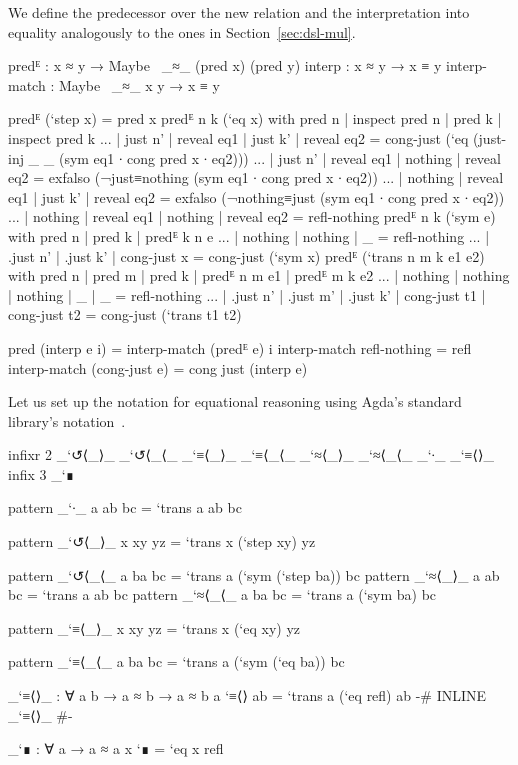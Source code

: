 We define the predecessor over the new  relation and the
interpretation into equality analogously to the ones in
Section~\ref{sec:dsl-mul}.
\begin{code}
predᴱ : x ≈ y → Maybe~ _≈_ (pred x) (pred y)
interp : x ≈ y → x ≡ y
interp-match : Maybe~ _≈_ x y → x ≡ y
\end{code}
\begin{code}[hide]
predᴱ (`step x) = pred x
predᴱ {n} {k} (`eq x) with pred n | inspect pred n | pred k | inspect pred k
... | just n' | reveal eq1 | just k' | reveal eq2 = cong-just (`eq (just-inj _ _ (sym eq1 ∙ cong pred x ∙ eq2)))
... | just n' | reveal eq1 | nothing | reveal eq2 = exfalso (¬just≡nothing (sym eq1 ∙ cong pred x ∙ eq2))
... | nothing | reveal eq1 | just k' | reveal eq2 = exfalso (¬nothing≡just (sym eq1 ∙ cong pred x ∙ eq2))
... | nothing | reveal eq1 | nothing | reveal eq2 = refl-nothing
predᴱ {n} {k} (`sym e) with pred n | pred k | predᴱ {k} {n} e
... | nothing  | nothing  | _ = refl-nothing
... | .just n' | .just k' | cong-just x = cong-just (`sym x)
predᴱ (`trans {n} {m} {k} e1 e2) with pred n | pred m | pred k | predᴱ {n} {m} e1 | predᴱ {m} {k} e2
... | nothing  | nothing  | nothing  | _  | _  = refl-nothing
... | .just n' | .just m' | .just k' | cong-just t1 | cong-just t2 = cong-just (`trans t1 t2)
\end{code}
\begin{code}[hide]
pred (interp e i) = interp-match (predᴱ e) i
interp-match refl-nothing = refl
interp-match (cong-just e) = cong just (interp e)
\end{code}

Let us set up the notation for equational reasoning using Agda's standard
library's notation~\cite{agda-stdlib}.
\begin{AgdaSuppressSpace}
\begin{code}[hide]
infixr 2 _`↺⟨_⟩_ _`↺⟨_⟨_ _`≡⟨_⟩_ _`≡⟨_⟨_ _`≈⟨_⟩_ _`≈⟨_⟨_ _`∙_ _`≡⟨⟩_
infix  3 _`∎

pattern _`∙_  {a} ab bc = `trans {a} ab bc
\end{code}
\begin{code}
pattern _`↺⟨_⟩_ x xy yz = `trans {x} (`step xy) yz
\end{code}
\begin{code}[hide]
pattern _`↺⟨_⟨_ a ba bc = `trans {a} (`sym (`step ba)) bc
pattern _`≈⟨_⟩_ a ab bc = `trans {a} ab bc
pattern _`≈⟨_⟨_ a ba bc = `trans {a} (`sym ba) bc
\end{code}
\begin{code}
pattern _`≡⟨_⟩_ x xy yz = `trans {x} (`eq xy) yz
\end{code}
\begin{code}[hide]
pattern _`≡⟨_⟨_ a ba bc = `trans {a} (`sym (`eq ba)) bc
\end{code}
\end{AgdaSuppressSpace}
\begin{code}[hide]
_`≡⟨⟩_ : ∀ a {b} → a ≈ b → a ≈ b
a `≡⟨⟩ ab = `trans {a} (`eq refl) ab
{-# INLINE _`≡⟨⟩_ #-}
\end{code}
\begin{code}
_`∎ : ∀ a → a ≈ a
x `∎ = `eq {x} refl
\end{code}
